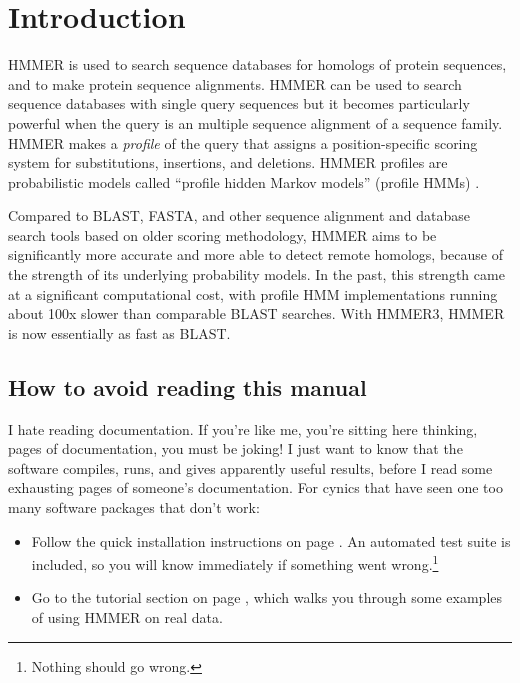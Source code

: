 \section{Introduction}
\setcounter{footnote}{0}

HMMER is used to search sequence databases for homologs of protein
sequences, and to make protein sequence alignments. HMMER can be used
to search sequence databases with single query sequences but it
becomes particularly powerful when the query is an multiple sequence
alignment of a sequence family. HMMER makes a \emph{profile} of the
query that assigns a position-specific scoring system for
substitutions, insertions, and deletions. HMMER profiles are
probabilistic models called ``profile hidden Markov models'' (profile
HMMs) \citep{Krogh94,Eddy98,Durbin98}.

Compared to BLAST, FASTA, and other sequence alignment and database
search tools based on older scoring methodology, HMMER aims to be
significantly more accurate and more able to detect remote homologs,
because of the strength of its underlying probability models. In the
past, this strength came at a significant computational cost, with
profile HMM implementations running about 100x slower than comparable
BLAST searches. With HMMER3, HMMER is now essentially as fast as
BLAST.


\subsection{How to avoid reading this manual}

I hate reading documentation. If you're like me, you're sitting here
thinking, \pageref{manualend} pages of documentation, you must be
joking! I just want to know that the software compiles, runs, and
gives apparently useful results, before I read some 
\pageref{manualend} exhausting pages of someone's documentation. For
cynics that have seen one too many software packages that don't
work:

\begin{itemize}
\item Follow the quick installation instructions on page
      \pageref{section:installation}. An automated test suite
      is included, so you will know immediately if something
      went wrong.\footnote{Nothing should go wrong.}
\item Go to the tutorial section on page
\pageref{section:tutorial}, which walks you through some examples of
using HMMER on real data.
\end{itemize}

